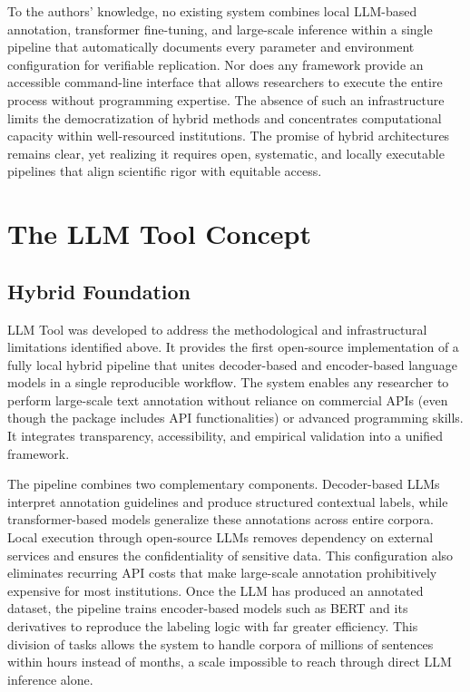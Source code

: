 \documentclass[12pt]{article}
\begin{document}
To the authors’ knowledge, no existing system combines local LLM-based annotation, transformer fine-tuning, and large-scale inference within a single pipeline that automatically documents every parameter and environment configuration for verifiable replication. Nor does any framework provide an accessible command-line interface that allows researchers to execute the entire process without programming expertise. The absence of such an infrastructure limits the democratization of hybrid methods and concentrates computational capacity within well-resourced institutions. The promise of hybrid architectures remains clear, yet realizing it requires open, systematic, and locally executable pipelines that align scientific rigor with equitable access.

\section{The LLM Tool Concept}

\subsection{Hybrid Foundation}

LLM Tool was developed to address the methodological and infrastructural limitations identified above. It provides the first open-source implementation of a fully local hybrid pipeline that unites decoder-based and encoder-based language models in a single reproducible workflow. The system enables any researcher to perform large-scale text annotation without reliance on commercial APIs (even though the package includes API functionalities) or advanced programming skills. It integrates transparency, accessibility, and empirical validation into a unified framework.

The pipeline combines two complementary components. Decoder-based LLMs interpret annotation guidelines and produce structured contextual labels, while transformer-based models generalize these annotations across entire corpora. Local execution through open-source LLMs removes dependency on external services and ensures the confidentiality of sensitive data. This configuration also eliminates recurring API costs that make large-scale annotation prohibitively expensive for most institutions. Once the LLM has produced an annotated dataset, the pipeline trains encoder-based models such as BERT and its derivatives to reproduce the labeling logic with far greater efficiency. This division of tasks allows the system to handle corpora of millions of sentences within hours instead of months, a scale impossible to reach through direct LLM inference alone.
\end{document}
